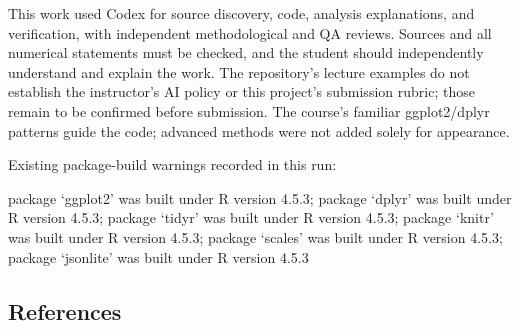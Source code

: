 \documentclass[
]{article}
\begin{document}
This work used Codex for source discovery, code, analysis explanations,
and verification, with independent methodological and QA reviews.
Sources and all numerical statements must be checked, and the student
should independently understand and explain the work. The repository's
lecture examples do not establish the instructor's AI policy or this
project's submission rubric; those remain to be confirmed before
submission. The course's familiar ggplot2/dplyr patterns guide the code;
advanced methods were not added solely for appearance.

Existing package-build warnings recorded in this run:

package `ggplot2' was built under R version 4.5.3; package `dplyr' was
built under R version 4.5.3; package `tidyr' was built under R version
4.5.3; package `knitr' was built under R version 4.5.3; package `scales'
was built under R version 4.5.3; package `jsonlite' was built under R
version 4.5.3

\subsection{References}\label{references}
\end{document}
